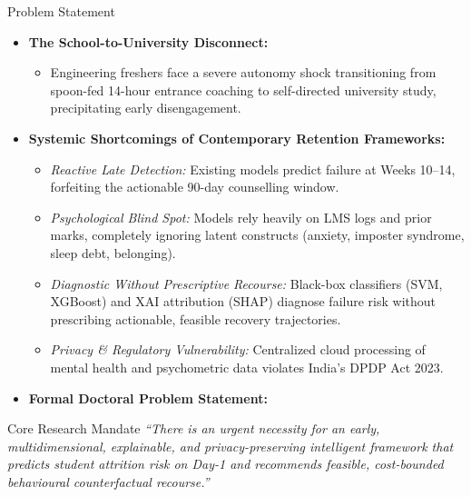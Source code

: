\documentclass{beamer}
\begin{document}
\begin{frame}[t]{Problem Statement}
  \begin{itemize}\setlength{\itemsep}{5pt}\small
    \item \textbf{The School-to-University Disconnect:}
    \begin{itemize}\setlength{\itemsep}{2pt}\footnotesize
      \item Engineering freshers face a severe autonomy shock transitioning from spoon-fed 14-hour entrance coaching to self-directed university study, precipitating early disengagement.
    \end{itemize}
    \item \textbf{Systemic Shortcomings of Contemporary Retention Frameworks:}
    \begin{itemize}\setlength{\itemsep}{2pt}\footnotesize
      \item \textit{Reactive Late Detection:} Existing models predict failure at Weeks 10--14, forfeiting the actionable 90-day counselling window.
      \item \textit{Psychological Blind Spot:} Models rely heavily on LMS logs and prior marks, completely ignoring latent constructs (anxiety, imposter syndrome, sleep debt, belonging).
      \item \textit{Diagnostic Without Prescriptive Recourse:} Black-box classifiers (SVM, XGBoost) and XAI attribution (SHAP) diagnose failure risk without prescribing actionable, feasible recovery trajectories.
      \item \textit{Privacy \& Regulatory Vulnerability:} Centralized cloud processing of mental health and psychometric data violates India's DPDP Act 2023.
    \end{itemize}
    \item \textbf{Formal Doctoral Problem Statement:}
  \end{itemize}
  \vspace{-0.2cm}
  \begin{block}{\scriptsize Core Research Mandate}
    \scriptsize \textit{``There is an urgent necessity for an early, multidimensional, explainable, and privacy-preserving intelligent framework that predicts student attrition risk on Day-1 and recommends feasible, cost-bounded behavioural counterfactual recourse.''}
  \end{block}
\end{frame}
\end{document}
